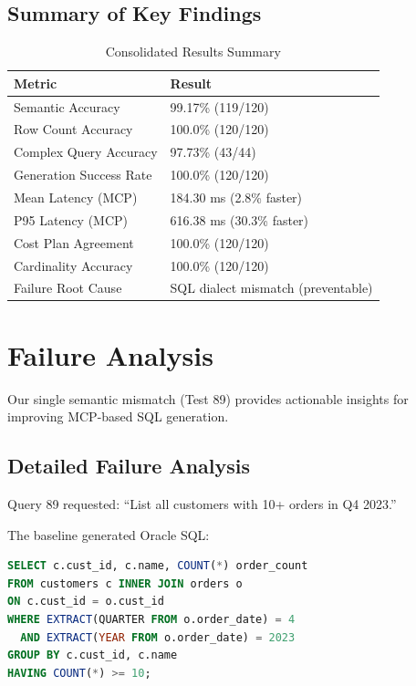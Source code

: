 

\subsection{Summary of Key Findings}

\begin{table}[h]
\centering
\caption{Consolidated Results Summary}
\small
\begin{tabular}{ll}
\toprule
\textbf{Metric} & \textbf{Result} \\
\midrule
Semantic Accuracy & 99.17\% (119/120) \\
Row Count Accuracy & 100.0\% (120/120) \\
Complex Query Accuracy & 97.73\% (43/44) \\
Generation Success Rate & 100.0\% (120/120) \\
\midrule
Mean Latency (MCP) & 184.30 ms (2.8\% faster) \\
P95 Latency (MCP) & 616.38 ms (30.3\% faster) \\
\midrule
Cost Plan Agreement & 100.0\% (120/120) \\
Cardinality Accuracy & 100.0\% (120/120) \\
\midrule
Failure Root Cause & SQL dialect mismatch (preventable) \\
\bottomrule
\end{tabular}
\end{table}

\section{Failure Analysis}
\label{sec:failure_analysis}

Our single semantic mismatch (Test 89) provides actionable insights for improving MCP-based SQL generation.

\subsection{Detailed Failure Analysis}

Query 89 requested: ``List all customers with 10+ orders in Q4 2023.''

The baseline generated Oracle SQL:
\begin{lstlisting}[language=SQL, basicstyle=\footnotesize\ttfamily]
SELECT c.cust_id, c.name, COUNT(*) order_count
FROM customers c INNER JOIN orders o
ON c.cust_id = o.cust_id
WHERE EXTRACT(QUARTER FROM o.order_date) = 4
  AND EXTRACT(YEAR FROM o.order_date) = 2023
GROUP BY c.cust_id, c.name
HAVING COUNT(*) >= 10;
\end{lstlisting}


